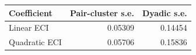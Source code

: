 \begin{tabular}{lrr}
\toprule
Coefficient & Pair-cluster s.e. & Dyadic s.e. \\
\midrule
Linear ECI & 0.05309 & 0.14454 \\
Quadratic ECI & 0.05706 & 0.15836 \\
\bottomrule
\end{tabular}
